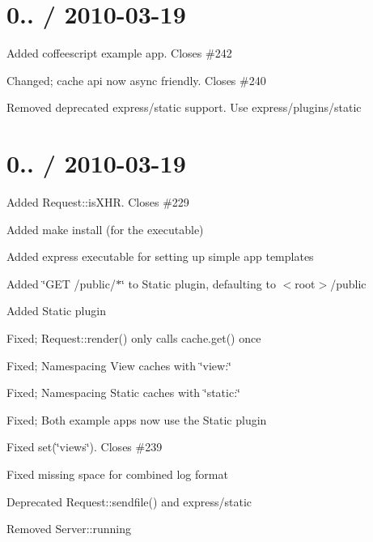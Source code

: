 {\ttfamily \section*{0.. / 2010-\/03-\/19 }}

{\ttfamily }

{\ttfamily 
\begin{DoxyItemize}
\item Added coffeescript example app. Closes \#242
\item Changed; cache api now async friendly. Closes \#240
\item Removed deprecated \textquotesingle{}express/static\textquotesingle{} support. Use \textquotesingle{}express/plugins/static\textquotesingle{}
\end{DoxyItemize}}

{\ttfamily \section*{0.. / 2010-\/03-\/19 }}

{\ttfamily }

{\ttfamily 
\begin{DoxyItemize}
\item Added Request\+::is\+X\+HR. Closes \#229
\item Added {\ttfamily make install} (for the executable)
\item Added {\ttfamily express} executable for setting up simple app templates
\item Added \char`\"{}\+G\+E\+T /public/$\ast$\char`\"{} to Static plugin, defaulting to $<$root$>$/public
\item Added Static plugin
\item Fixed; Request\+::render() only calls cache.\+get() once
\item Fixed; Namespacing View caches with \char`\"{}view\+:\char`\"{}
\item Fixed; Namespacing Static caches with \char`\"{}static\+:\char`\"{}
\item Fixed; Both example apps now use the Static plugin
\item Fixed set(\char`\"{}views\char`\"{}). Closes \#239
\item Fixed missing space for combined log format
\item Deprecated Request\+::sendfile() and \textquotesingle{}express/static\textquotesingle{}
\item Removed Server\+::running
\end{DoxyItemize}}

